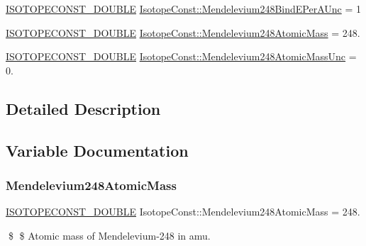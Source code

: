 \begin{DoxyCompactItemize}
\item 
\mbox{\hyperlink{group___isotope_const-_macros_ga8f45a7272ce02c0b4c65c44636ed719a}{I\+S\+O\+T\+O\+P\+E\+C\+O\+N\+S\+T\+\_\+\+D\+O\+U\+B\+LE}} \mbox{\hyperlink{group___isotope_const-_mendelevium-_md248_ga4a517a96332c49e20888c1a5a187aae5}{Isotope\+Const\+::\+Mendelevium248\+Bind\+E\+Per\+A\+Unc}} = 1
\item 
\mbox{\hyperlink{group___isotope_const-_macros_ga8f45a7272ce02c0b4c65c44636ed719a}{I\+S\+O\+T\+O\+P\+E\+C\+O\+N\+S\+T\+\_\+\+D\+O\+U\+B\+LE}} \mbox{\hyperlink{group___isotope_const-_mendelevium-_md248_ga06e503e8462907d123aca9e4b40a851c}{Isotope\+Const\+::\+Mendelevium248\+Atomic\+Mass}} = 248.
\item 
\mbox{\hyperlink{group___isotope_const-_macros_ga8f45a7272ce02c0b4c65c44636ed719a}{I\+S\+O\+T\+O\+P\+E\+C\+O\+N\+S\+T\+\_\+\+D\+O\+U\+B\+LE}} \mbox{\hyperlink{group___isotope_const-_mendelevium-_md248_ga84f15de032f4064b4d3be531e0397fad}{Isotope\+Const\+::\+Mendelevium248\+Atomic\+Mass\+Unc}} = 0.
\end{DoxyCompactItemize}


\subsection{Detailed Description}


\subsection{Variable Documentation}
\mbox{\label{group___isotope_const-_mendelevium-_md248_ga06e503e8462907d123aca9e4b40a851c}} 
\subsubsection{\texorpdfstring{Mendelevium248\+Atomic\+Mass}{Mendelevium248AtomicMass}}
{\footnotesize\ttfamily \mbox{\hyperlink{group___isotope_const-_macros_ga8f45a7272ce02c0b4c65c44636ed719a}{I\+S\+O\+T\+O\+P\+E\+C\+O\+N\+S\+T\+\_\+\+D\+O\+U\+B\+LE}} Isotope\+Const\+::\+Mendelevium248\+Atomic\+Mass = 248.}

\$ \$ Atomic mass of Mendelevium-\/248 in amu. \mbox{\label{group___isotope_const-_mendelevium-_md248_ga84f15de032f4064b4d3be531e0397fad}} 
